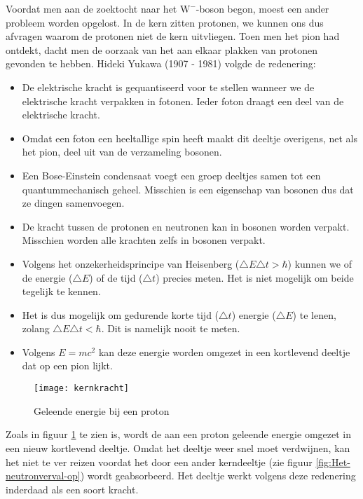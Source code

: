 Voordat men aan de zoektocht naar het $\mathrm{W}^{-}$-boson begon,
moest een ander probleem worden opgelost. In de kern zitten protonen,
we kunnen ons dus afvragen waarom de protonen niet de kern uitvliegen.
Toen men het pion had ontdekt, dacht men de oorzaak van het aan elkaar
plakken van protonen gevonden te hebben. Hideki Yukawa (1907 - 1981)
volgde de redenering:
\begin{itemize}
\item De elektrische kracht is gequantiseerd voor te stellen wanneer we
de elektrische kracht verpakken in fotonen. Ieder foton draagt een
deel van de elektrische kracht. 
\item Omdat een foton een heeltallige spin heeft maakt dit deeltje overigens,
net als het pion, deel uit van de verzameling bosonen.
\item Een Bose-Einstein condensaat voegt een groep deeltjes samen tot een
quantummechanisch geheel. Misschien is een eigenschap van bosonen
dus dat ze dingen samenvoegen.
\item De kracht tussen de protonen en neutronen kan in bosonen worden verpakt.
Misschien worden alle krachten zelfs in bosonen verpakt.
\item Volgens het onzekerheidsprincipe van Heisenberg ($\triangle E\triangle t>\hbar$)
kunnen we of de energie ($\triangle E$) of de tijd ($\triangle t$)
precies meten. Het is niet mogelijk om beide tegelijk te kennen.
\item Het is dus mogelijk om gedurende korte tijd ($\triangle t$) energie
($\triangle E$) te lenen, zolang $\triangle E\triangle t<\hbar$.
Dit is namelijk nooit te meten.
\item Volgens $E=mc^{2}$ kan deze energie worden omgezet in een kortlevend
deeltje dat op een pion lijkt.
\end{itemize}
\begin{figure}[h]
\noindent \begin{centering}
\texttt{[image: kernkracht]}
\par\end{centering}

\caption{\label{fig:Geleende-energie-bij}Geleende energie bij een proton}
\end{figure}


Zoals in figuur \ref{fig:Geleende-energie-bij} te zien is, wordt de aan
een proton geleende energie omgezet in een nieuw kortlevend deeltje.
Omdat het deeltje weer snel moet verdwijnen, kan het niet te ver reizen
voordat het door een ander kerndeeltje (zie figuur
\ref{fig:Het-neutronverval-op}) wordt geabsorbeerd. Het deeltje werkt
volgens deze redenering inderdaad als een soort kracht. 

